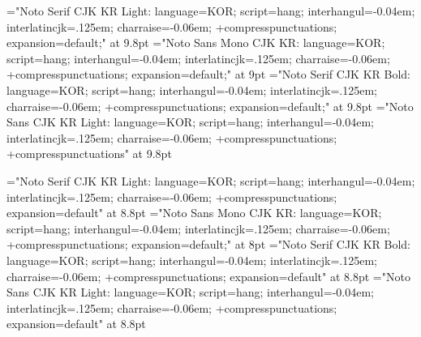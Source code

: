 %
%



\sethangulfont\tenmj="Noto Serif CJK KR Light:%
  language=KOR;%
  script=hang;%
  interhangul=-0.04em;%
  interlatincjk=.125em;%
  charraise=-0.06em;%
  +compresspunctuations;%
  expansion=default;" at 9.8pt
\sethangulfont\tentz="Noto Sans Mono CJK KR:%
  language=KOR;%
  script=hang;%
  interhangul=-0.04em;%
  interlatincjk=.125em;%
  charraise=-0.06em;%
  +compresspunctuations;%
  expansion=default;" at 9pt
\sethangulfont\tenbd="Noto Serif CJK KR Bold:%
  language=KOR;%
  script=hang;%
  interhangul=-0.04em;%
  interlatincjk=.125em;%
  charraise=-0.06em;%
  +compresspunctuations;%
  expansion=default;" at 9.8pt
\sethangulfont\tengt="Noto Sans CJK KR Light:%
  language=KOR;%
  script=hang;%
  interhangul=-0.04em;%
  interlatincjk=.125em;%
  charraise=-0.06em;%
  +compresspunctuations;%
  +compresspunctuations" at 9.8pt

\sethangulfont\ninemj="Noto Serif CJK KR Light:%
  language=KOR;%
  script=hang;%
  interhangul=-0.04em;%
  interlatincjk=.125em;%
  charraise=-0.06em;%
  +compresspunctuations;%
  expansion=default" at 8.8pt
\sethangulfont\ninetz="Noto Sans Mono CJK KR:
  language=KOR;%
  script=hang;%
  interhangul=-0.04em;%
  interlatincjk=.125em;%
  charraise=-0.06em;%
  +compresspunctuations;%
  expansion=default;" at 8pt
\sethangulfont\ninebd="Noto Serif CJK KR Bold:%
  language=KOR;%
  script=hang;%
  interhangul=-0.04em;%
  interlatincjk=.125em;%
  charraise=-0.06em;%
  +compresspunctuations;%
  expansion=default" at 8.8pt
\sethangulfont\ninegt="Noto Sans CJK KR Light:%
  language=KOR;%
  script=hang;%
  interhangul=-0.04em;%
  interlatincjk=.125em;%
  charraise=-0.06em;%
  +compresspunctuations;%
  expansion=default" at 8.8pt

